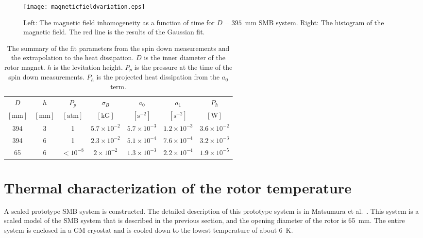 \documentclass[journal]{IEEEtran}
\begin{document}
\begin{figure}[htb]
   \centering
   \texttt{[image: magneticfieldvariation.eps]} %
   \caption{Left: The magnetic field inhomogeneity as a function of time for $D=395$~mm SMB system. Right: The histogram of the magnetic field. The red line is the results of the Gaussian fit. }
   \label{fig:Bval}
\end{figure}


\begin{table*}[t]
   \centering
   \begin{tabular}{c|c|c|c|c|c|c} %
	    $D$ & $h$& $P_p$ & $\sigma_B$ &$a_0$ & $a_1$  & $P_h$\\
	     $[\mbox{mm}]$ & $[\mbox{mm}]$ & $[\mbox{atm}]$ & $[\mbox{kG}]$ & $[\mbox{s}^{-2}]$  & $[\mbox{s}^{-2}]$  & $[\mbox{W}]$ \\ \hline
        394 & 3  & 1  & $5.7\times10^{-2}$ & $5.7\times10^{-3}$  & $1.2\times10^{-3}$ & $3.6\times10^{-2}$\\
	394 & 6  &  1 & $2.3\times10^{-2}$ & $5.1\times10^{-4}$ & $7.6\times10^{-4}$ & $3.2\times10^{-3}$\\
	65 & 6   &  $<10^{-8}$ & $2\times10^{-2}$ & $1.3\times10^{-3}$ & $2.2\times10^{-4}$ & $1.9\times10^{-5}$
   \end{tabular}
   \caption{The summary of the fit parameters from the spin down measurements and the extrapolation to the heat dissipation.
     $D$ is the inner diameter of the rotor magnet.
     $h$ is the levitation height.
     $P_p$ is the pressure at the time of the spin down measurements.
     $P_h$ is the projected heat dissipation from the $a_0$ term.}

   \label{tab:fitpar}
\end{table*}

\section{Thermal characterization of the rotor temperature}
A scaled prototype SMB system is constructed.
The detailed description of this prototype system is in Matsumura et al.~\cite{matsumura_eucas2015}.
This system is a scaled model of the SMB system that is described in the previous section, and the opening diameter of the rotor is 65~mm.
The entire system is enclosed in a GM cryostat and is cooled down to the lowest temperature of about 6~K.
\end{document}

